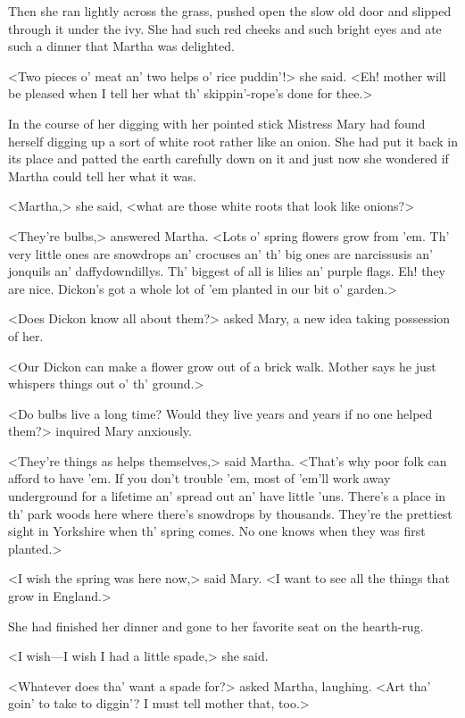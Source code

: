 Then she ran lightly across the grass, pushed open the slow old door and slipped through it under the ivy. She had such red cheeks and such bright eyes and ate such a dinner that Martha was delighted.

<Two pieces o' meat an' two helps o' rice puddin'!> she said. <Eh! mother will be pleased when I tell her what th' skippin'-rope's done for thee.>

In the course of her digging with her pointed stick Mistress Mary had found herself digging up a sort of white root rather like an onion. She had put it back in its place and patted the earth carefully down on it and just now she wondered if Martha could tell her what it was.

<Martha,> she said, <what are those white roots that look like onions?>

<They're bulbs,> answered Martha. <Lots o' spring flowers grow from 'em. Th' very little ones are snowdrops an' crocuses an' th' big ones are narcissusis an' jonquils an' daffydowndillys. Th' biggest of all is lilies an' purple flags. Eh! they are nice. Dickon's got a whole lot of 'em planted in our bit o' garden.>

<Does Dickon know all about them?> asked Mary, a new idea taking possession of her.

<Our Dickon can make a flower grow out of a brick walk. Mother says he just whispers things out o' th' ground.>

<Do bulbs live a long time? Would they live years and years if no one helped them?> inquired Mary anxiously.

<They're things as helps themselves,> said Martha. <That's why poor folk can afford to have 'em. If you don't trouble 'em, most of 'em'll work away underground for a lifetime an' spread out an' have little 'uns. There's a place in th' park woods here where there's snowdrops by thousands. They're the prettiest sight in Yorkshire when th' spring comes. No one knows when they was first planted.>

<I wish the spring was here now,> said Mary. <I want to see all the things that grow in England.>

She had finished her dinner and gone to her favorite seat on the hearth-rug.

<I wish—I wish I had a little spade,> she said.

<Whatever does tha' want a spade for?> asked Martha, laughing. <Art tha' goin' to take to diggin'? I must tell mother that, too.>

